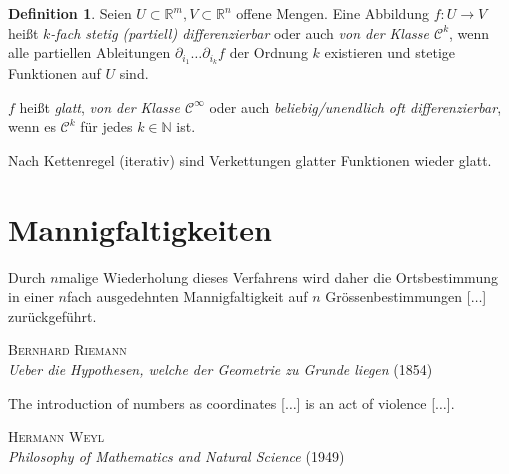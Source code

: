 \documentclass[a4paper]{scrreprt}
\numberwithin{equation}{chapter}
\newcommand{\sC}{\mathcal{C}^{\infty}}
\theoremstyle{definition}
\newtheorem{defn}{Definition}[section]
\begin{document}
\begin{defn}
	Seien $U \subset \mathbb R^m, V \subset \mathbb R^n$ offene Mengen. Eine Abbildung $f\colon U\to V$ heißt \emph{$k$-fach stetig (partiell) differenzierbar} oder auch \emph{von der Klasse $\mathcal C^k$}, wenn alle partiellen Ableitungen $\partial_{i_1} \dots \partial_{i_k} f$ der Ordnung $k$ existieren und stetige Funktionen auf $U$ sind.

	$f$ heißt \emph{glatt}, \emph{von der Klasse $\sC$} oder auch \emph{beliebig/unendlich oft differenzierbar}, wenn es $\mathcal C^k$ für jedes $k\in\mathbb N$ ist.

	Nach Kettenregel (iterativ) sind Verkettungen glatter Funktionen wieder glatt.
\end{defn}


\chapter{Mannigfaltigkeiten}
\epigraph{Durch $n$malige Wiederholung dieses Verfahrens wird daher die Ortsbestimmung in einer $n$fach ausgedehnten Mannigfaltigkeit auf $n$ Grössenbestimmungen [$\ldots$] zurückgeführt.}{\textsc{Bernhard Riemann}\\\emph{Ueber die Hypothesen, welche der Geometrie zu Grunde liegen} (1854)}
\epigraph{The introduction of numbers as coordinates [$\ldots$] is an act of violence [$\ldots$].}{\textsc{Hermann Weyl}\\\emph{Philosophy of Mathematics and Natural Science} (1949)}
\end{document}
